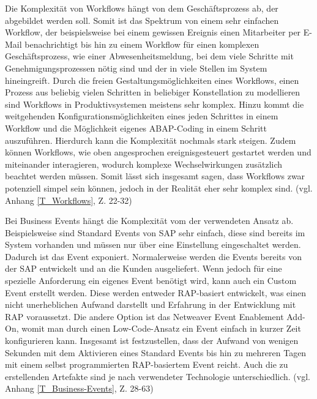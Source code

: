 Die Komplexität von Workflows hängt von dem Geschäftsprozess ab, der abgebildet werden soll. Somit ist das Spektrum von einem sehr einfachen Workflow, der beispielsweise bei einem gewissen Ereignis einen Mitarbeiter per E-Mail benachrichtigt bis hin zu einem Workflow für einen komplexen Geschäftsprozess, wie einer Abwesenheitsmeldung, bei dem viele Schritte mit Genehmigungsprozessen nötig sind und der in viele Stellen im System hineingreift. Durch die freien Gestaltungsmöglichkeiten eines Workflows, einen Prozess aus beliebig vielen Schritten in beliebiger Konstellation zu modellieren sind Workflows in Produktivsystemen meistens sehr komplex. Hinzu kommt die weitgehenden Konfigurationsmöglichkeiten eines jeden Schrittes in einem Workflow und die Möglichkeit eigenes ABAP-Coding in einem Schritt auszuführen. Hierdurch kann die Komplexität nochmals stark steigen. Zudem können Workflows, wie oben angesprochen ereignisgesteuert gestartet werden und miteinander interagieren, wodurch komplexe Wechselwirkungen zusätzlich beachtet werden müssen. Somit lässt sich insgesamt sagen, dass Workflows zwar potenziell simpel sein können, jedoch in der Realität eher sehr komplex sind. (vgl. Anhang \ref{T_Workflows}, Z. 22-32)

Bei Business Events hängt die Komplexität vom der verwendeten Ansatz ab. Beispielsweise sind Standard Events von SAP sehr einfach, diese sind bereits im System vorhanden und müssen nur über eine Einstellung eingeschaltet werden. Dadurch ist das Event exponiert. Normalerweise werden die Events bereits von der SAP entwickelt und an die Kunden ausgeliefert. Wenn jedoch für eine spezielle Anforderung ein eigenes Event benötigt wird, kann auch ein Custom Event erstellt werden. Diese werden entweder RAP-basiert entwickelt, was einen nicht unerheblichen Aufwand darstellt und Erfahrung in der Entwicklung mit RAP voraussetzt. Die andere Option ist das Netweaver Event Enablement Add-On, womit man durch einen Low-Code-Ansatz ein Event einfach in kurzer Zeit konfigurieren kann. Insgesamt ist festzustellen, dass der Aufwand von wenigen Sekunden mit dem Aktivieren eines Standard Events bis hin zu mehreren Tagen mit einem selbst programmierten RAP-basiertem Event reicht. Auch die zu erstellenden Artefakte sind je nach verwendeter Technologie unterschiedlich. (vgl. Anhang \ref{T_Business-Events}, Z. 28-63)

